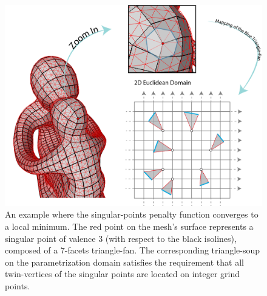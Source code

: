 \begin{figure}[ht]
\centering
\includegraphics[width=16cm]{figures/singular_points/singular_points_penalty_function_minimum.png}
\caption[Singular-Points Penalty Function Global Minimum Example]{An example where the singular-points penalty function converges to a local minimum. The red point on the mesh's surface represents a singular point of valence 3 (with respect to the black isolines), composed of a 7-facets triangle-fan. The corresponding triangle-soup on the parametrization domain satisfies the requirement that all twin-vertices of the singular points are located on integer grind points.}
\label{fig:singular_points_penalty_minimum}
\end{figure}
